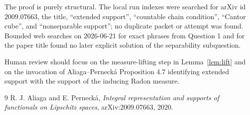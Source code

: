 \documentclass[11pt]{article}
\begin{document}
The proof is purely structural.  The local run indexes were searched for
arXiv id \(2009.07663\), the title, ``extended support'', ``countable chain
condition'', ``Cantor cube'', and ``nonseparable support''; no duplicate packet
or attempt was found.  Bounded web searches on 2026-06-21 for exact phrases
from Question 1 and for the paper title found no later explicit solution of
the separability subquestion.

Human review should focus on the measure-lifting step in Lemma~\ref{lem:lift}
and on the invocation of Aliaga--Perneck\'a Proposition 4.7 identifying
extended support with the support of the inducing Radon measure.

\begin{thebibliography}{9}
R. J. Aliaga and E. Perneck\'a,
\emph{Integral representation and supports of functionals on Lipschitz spaces},
arXiv:2009.07663, 2020.
\end{thebibliography}
\end{document}
